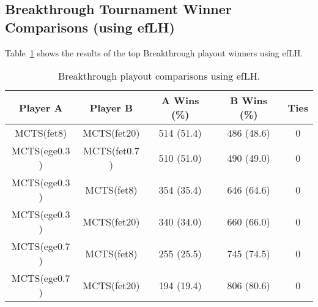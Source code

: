 \documentclass{article}
\begin{document}
\subsection{Breakthrough Tournament Winner Comparisons (using efLH)}


Table~\ref{tbl:bt-efLH-toptourney} shows the results of the top Breakthrough playout winners using efLH.

\begin{table}[h!]
\begin{center}
\begin{tabular}{|c|c|ccc|}
\hline
Player A & Player B                  & A Wins (\%)  & B Wins (\%)  & Ties \\ 
\hline
MCTS(fet$8$)   & MCTS(fet$20$)       & 514 (51.4)   & 486 (48.6)   & 0    \\
MCTS(ege$0.3$) & MCTS(fet$0.7$)      & 510 (51.0)   & 490 (49.0)   & 0    \\
\hline
MCTS(ege$0.3$) & MCTS(fet$8$)        & 354 (35.4)   & 646 (64.6)   & 0    \\
MCTS(ege$0.3$) & MCTS(fet$20$)       & 340 (34.0)   & 660 (66.0)   & 0    \\
MCTS(ege$0.7$) & MCTS(fet$8$)        & 255 (25.5)   & 745 (74.5)   & 0    \\
MCTS(ege$0.7$) & MCTS(fet$20$)       & 194 (19.4)   & 806 (80.6)   & 0    \\
\hline
\end{tabular}
\end{center}
\caption{Breakthrough playout comparisons using efLH. \label{tbl:bt-efLH-toptourney}}
\end{table}
\end{document}
